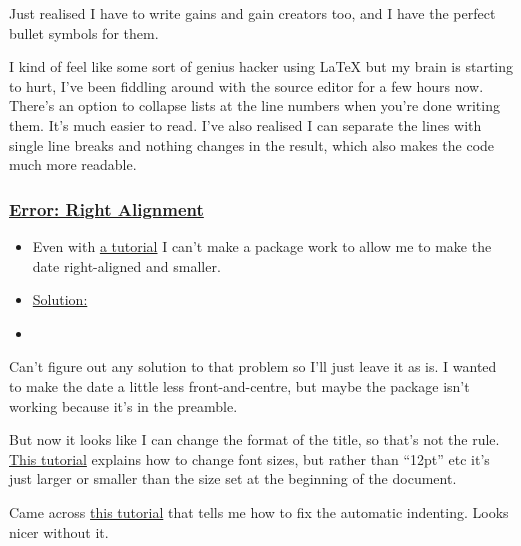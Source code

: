 \documentclass[12pt]{article}
\begin{document}
Just realised I have to write gains and gain creators too, and I have the perfect bullet symbols for them. 

I kind of feel like some sort of genius hacker using LaTeX but my brain is starting to hurt, I’ve been fiddling around with the source editor for a few hours now.
There’s an option to collapse lists at the line numbers when you’re done writing them. It’s much easier to read. I’ve also realised I can separate the lines with single line breaks and nothing changes in the result, which also makes the code much more readable.

\subsubsection{\texorpdfstring{\underline{Error: Right Alignment}}{}}\label{error:er4}
\begin{itemize}
    \item Even with \href{https://www.overleaf.com/learn/latex/Text_alignment#Right-justified_text}{a tutorial} I can’t make a package work to allow me to make the date right-aligned and smaller.
\end{itemize}
\begin{itemize}
\renewcommand{\labelitemi}{}
\item \underline{Solution:}
\renewcommand{\labelitemi}{$\bullet$}
    \item 
\end{itemize}
    
Can’t figure out any solution to that problem so I’ll just leave it as is. I wanted to make the date a little less front-and-centre, but maybe the package isn’t working because it’s in the preamble.

But now it looks like I can change the format of the title, so that’s not the rule. \href{https://www.overleaf.com/learn/latex/Font_sizes,_families,_and_styles}{This tutorial} explains how to change font sizes, but rather than “12pt” etc it’s just larger or smaller than the size set at the beginning of the document.

Came across \href{https://www.overleaf.com/learn/latex/Paragraph_formatting#Reference_guide}{this tutorial} that tells me how to fix the automatic indenting. Looks nicer without it.
\end{document}
